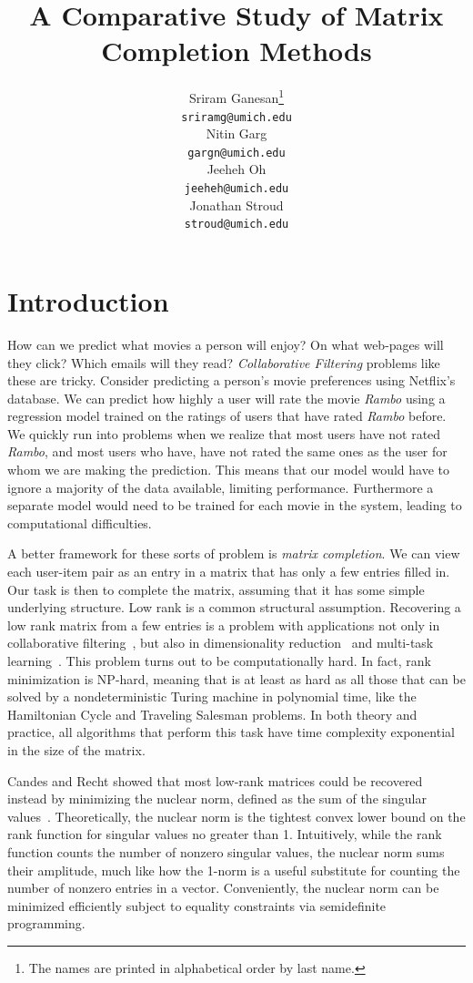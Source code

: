 \documentclass{article} %
\title{A Comparative Study of Matrix Completion Methods}
\author{
Sriram Ganesan\thanks{ The names are printed in alphabetical order by last name.} \\
\texttt{sriramg@umich.edu} \\
\And
Nitin Garg \\
\texttt{gargn@umich.edu} \\
\AND
Jeeheh Oh \\
\texttt{jeeheh@umich.edu} \\
\And
Jonathan Stroud \\
\texttt{stroud@umich.edu} \\
}
\begin{document}
\maketitle

\begin{abstract}

\end{abstract}

\section{Introduction}

How can we predict what movies a person will enjoy? On what web-pages
will they click? Which emails will they read? \emph{Collaborative
  Filtering} problems like these are tricky. Consider predicting a
person's movie preferences using Netflix's database. We can predict
how highly a user will rate the movie \textit{Rambo} using a
regression model trained on the ratings of users that have rated
\textit{Rambo} before. We quickly run into problems when we realize
that most users have not rated \textit{Rambo}, and most users who
have, have not rated the same ones as the user for whom we are making
the prediction. This means that our model would have to ignore a
majority of the data available, limiting performance. Furthermore a
separate model would need to be trained for each movie in the system,
leading to computational difficulties.

A better framework for these sorts of problem is \emph{matrix
  completion}. We can view each user-item pair as an entry in a matrix
that has only a few entries filled in. Our task is then to complete
the matrix, assuming that it has some simple underlying structure. Low
rank is a common structural assumption. Recovering a low rank matrix
from a few entries is a problem with applications not only in
collaborative filtering~\cite{r25}, but also in dimensionality
reduction~\cite{r20, r28} and multi-task learning~\cite{r2, r22}. This
problem turns out to be computationally hard. In fact, rank
minimization is NP-hard, meaning that is at least as hard as all those
that can be solved by a nondeterministic Turing machine in polynomial
time, like the Hamiltonian Cycle and Traveling Salesman problems. In
both theory and practice, all algorithms that perform this task have
time complexity exponential in the size of the matrix.

Candes and Recht showed that most low-rank matrices could be recovered instead by minimizing the nuclear norm, defined as the sum of the
singular values~\cite{r4}. Theoretically, the nuclear
norm is the tightest convex lower bound on the rank function for
singular values no greater than 1. Intuitively, while the rank
function counts the number of nonzero singular values, the nuclear
norm sums their amplitude, much like how the 1-norm is a useful
substitute for counting the number of nonzero entries in a vector.
Conveniently, the nuclear norm can be minimized efficiently subject to
equality constraints via semidefinite programming.
\end{document}
